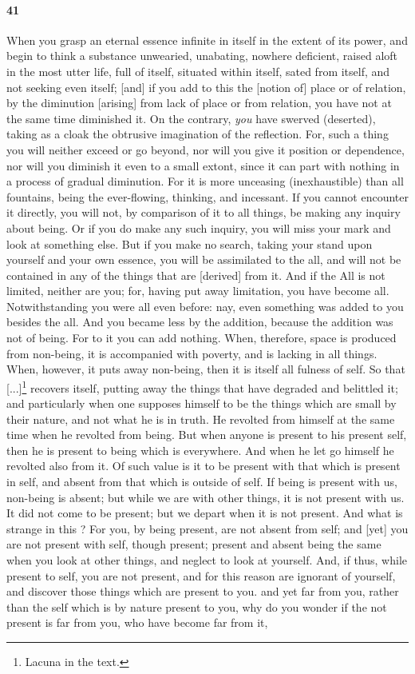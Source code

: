 \documentclass{article}
\begin{document}
\paragraph{41} When you grasp an eternal essence infinite in itself in the extent of its power, and begin to think a substance unwearied, unabating, nowhere deficient, raised aloft in the most utter life, full of itself, situated within itself, sated from itself, and not seeking even itself; [and] if you add to this the [notion of] place or of relation, by the diminution [arising] from lack of place or from relation, you have not at the same time diminished it. On the contrary, \textit{you} have swerved (deserted), taking as a cloak the obtrusive imagination of the reflection. For, such a thing you will neither exceed or go beyond, nor will you give it position or dependence, nor will you diminish it even to a small extont, since it can part with nothing in a process of gradual diminution. For it is more unceasing (inexhaustible) than all fountains, being the ever-flowing, thinking, and incessant. If you cannot encounter it directly, you will not, by comparison of it to all things, be making any inquiry about being. Or if you do make any such inquiry, you will miss your mark and look at something else. But if you make no search, taking your stand upon yourself and your own essence, you will be assimilated to the all, and will not be contained in any of the things that are [derived] from it. And if the All is not limited, neither are you; for, having put away limitation, you have become all. Notwithstanding you were all even before: nay, even something was added to you besides the all. And you became less by the addition, because the addition was not of being. For to it you can add nothing. When, therefore, space is produced from non-being, it is accompanied with poverty, and is lacking in all things. When, however, it puts away non-being, then it is itself all fulness of self. So that [...]\footnote{Lacuna in the text.} recovers itself, putting away the things that have degraded and belittled it; and particularly when one supposes himself to be the things which are small by their nature, and not what he is in truth. He revolted from himself at the same time when he revolted from being. But when anyone is present to his present self, then he is present to being which is everywhere. And when he let go himself he revolted also from it. Of such value is it to be present with that which is present in self, and absent from that which is outside of self. If being is present with us, non-being is absent; but while we are with other things, it is not present with us. It did not come to be present; but we depart when it is not present. And what is strange in this ? For you, by being present, are not absent from self; and [yet] you are not present with self, though present; present and absent being the same when you look at other things, and neglect to look at yourself. And, if thus, while present to self, you are not present, and for this reason are ignorant of yourself, and discover those things which are present to you. and yet far from you, rather than the self which is by nature present to you, why do you wonder if the not present is far from you, who have become far from it, 
\end{document}
